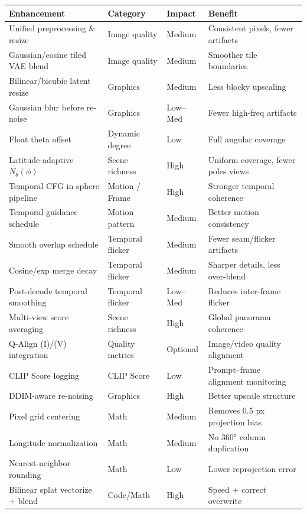 \documentclass[11pt,a4paper]{article}
\begin{document}
\begin{table}[H]
\centering
\footnotesize
\renewcommand{\arraystretch}{1.2}
\begin{tabular}{@{}p{}p{}p{}p{}@{}}
\toprule
\textbf{Enhancement} & \textbf{Category} & \textbf{Impact} & \textbf{Benefit} \\
\midrule
Unified preprocessing \& resize & Image quality & Medium & Consistent pixels, fewer artifacts \\
Gaussian/cosine tiled VAE blend & Image quality & Medium & Smoother tile boundaries \\
Bilinear/bicubic latent resize & Graphics & Medium & Less blocky upscaling \\
Gaussian blur before re-noise & Graphics & Low--Med & Fewer high-freq artifacts \\
Float theta offset & Dynamic degree & Low & Full angular coverage \\
Latitude-adaptive $N_\theta(\phi)$ & Scene richness & High & Uniform coverage, fewer poles views \\
Temporal CFG in sphere pipeline & Motion / Frame & High & Stronger temporal coherence \\
Temporal guidance schedule & Motion pattern & Medium & Better motion consistency \\
Smooth overlap schedule & Temporal flicker & Medium & Fewer seam/flicker artifacts \\
Cosine/exp merge decay & Temporal flicker & Medium & Sharper details, less over-blend \\
Post-decode temporal smoothing & Temporal flicker & Low--Med & Reduces inter-frame flicker \\
Multi-view score averaging & Scene richness & High & Global panorama coherence \\
Q-Align (I)/(V) integration & Quality metrics & Optional & Image/video quality alignment \\
CLIP Score logging & CLIP Score & Low & Prompt–frame alignment monitoring \\
DDIM-aware re-noising & Graphics & High & Better upscale structure \\
Pixel grid centering & Math & Medium & Removes 0.5 px projection bias \\
Longitude normalization & Math & Medium & No 360° column duplication \\
Nearest-neighbor rounding & Math & Low & Lower reprojection error \\
Bilinear splat vectorize + blend & Code/Math & High & Speed + correct overwrite \\

\end{tabular}
\end{table}
\end{document}
